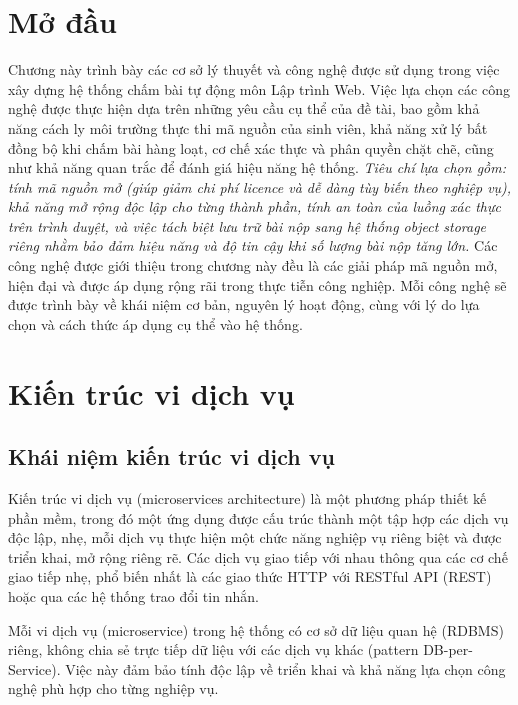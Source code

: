 \documentclass[../BTL.tex]{subfiles}
\begin{document}
\section{Mở đầu}
\label{section:2.1}

Chương này trình bày các cơ sở lý thuyết và công nghệ được sử dụng trong việc xây dựng hệ thống chấm bài tự động môn Lập trình Web. Việc lựa chọn các công nghệ được thực hiện dựa trên những yêu cầu cụ thể của đề tài, bao gồm khả năng cách ly môi trường thực thi mã nguồn của sinh viên, khả năng xử lý bất đồng bộ khi chấm bài hàng loạt, cơ chế xác thực và phân quyền chặt chẽ, cũng như khả năng quan trắc để đánh giá hiệu năng hệ thống. \textit{Tiêu chí lựa chọn gồm: tính mã nguồn mở (giúp giảm chi phí licence và dễ dàng tùy biến theo nghiệp vụ), khả năng mở rộng độc lập cho từng thành phần, tính an toàn của luồng xác thực trên trình duyệt, và việc tách biệt lưu trữ bài nộp sang hệ thống object storage riêng nhằm bảo đảm hiệu năng và độ tin cậy khi số lượng bài nộp tăng lớn.} Các công nghệ được giới thiệu trong chương này đều là các giải pháp mã nguồn mở, hiện đại và được áp dụng rộng rãi trong thực tiễn công nghiệp. Mỗi công nghệ sẽ được trình bày về khái niệm cơ bản, nguyên lý hoạt động, cùng với lý do lựa chọn và cách thức áp dụng cụ thể vào hệ thống.

\section{Kiến trúc vi dịch vụ}
\label{section:2.2}

\subsection{Khái niệm kiến trúc vi dịch vụ}
\label{section:2.2.1}

Kiến trúc vi dịch vụ (microservices architecture) là một phương pháp thiết kế phần mềm, trong đó một ứng dụng được cấu trúc thành một tập hợp các dịch vụ độc lập, nhẹ, mỗi dịch vụ thực hiện một chức năng nghiệp vụ riêng biệt và được triển khai, mở rộng riêng rẽ. Các dịch vụ giao tiếp với nhau thông qua các cơ chế giao tiếp nhẹ, phổ biến nhất là các giao thức HTTP với RESTful API (REST) hoặc qua các hệ thống trao đổi tin nhắn.

Mỗi vi dịch vụ (microservice) trong hệ thống có cơ sở dữ liệu quan hệ (RDBMS) riêng, không chia sẻ trực tiếp dữ liệu với các dịch vụ khác (pattern DB-per-Service). Việc này đảm bảo tính độc lập về triển khai và khả năng lựa chọn công nghệ phù hợp cho từng nghiệp vụ.
\end{document}
